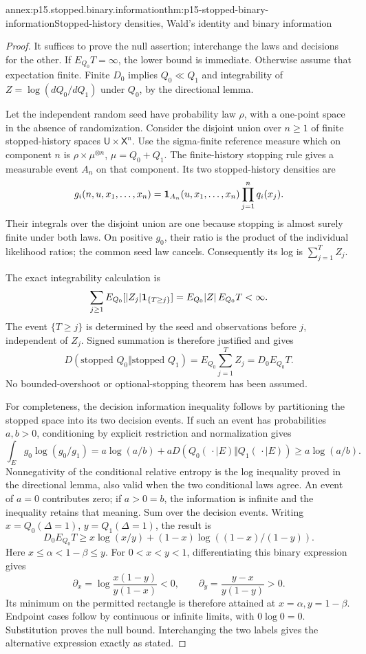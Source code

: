 \begin{annexitem}{annex:p15.stopped.binary.information}{thm:p15-stopped-binary-information}{Stopped-history densities, Wald's identity and binary information}
\begin{proof}
It suffices to prove the null assertion; interchange the laws and
decisions for the other. If \(E_{Q_0}T=\infty\), the lower bound is
immediate. Otherwise assume that expectation finite.
Finite \(D_0\) implies \(Q_0\ll Q_1\) and integrability of
\(Z=\log(dQ_0/dQ_1)\) under \(Q_0\), by the directional lemma.

Let the independent random seed have probability law \(\rho\), with
a one-point space in the absence of randomization.
Consider the disjoint union over \(n\geq1\) of finite stopped-history
spaces \(\mathsf U\times\mathsf X^n\).
Use the sigma-finite reference measure which on component \(n\)
is \(\rho\times\mu^{\otimes n}\), \(\mu=Q_0+Q_1\).
The finite-history stopping rule gives a measurable event \(A_n\)
on that component. Its two stopped-history densities are
\[
 g_i(n,u,x_1,\ldots,x_n)
       ={\bf1}_{A_n}(u,x_1,\ldots,x_n)\prod_{j=1}^nq_i(x_j).
\]
Their integrals over the disjoint union are one because stopping
is almost surely finite under both laws.
On positive \(g_0\), their ratio is the product of the individual
likelihood ratios; the common seed law cancels.
Consequently its log is \(\sum_{j=1}^T Z_j\).

The exact integrability calculation is
\[
 \sum_{j\geq1}E_{Q_0}[|Z_j|{\bf1}_{\{T\geq j\}}]
 =E_{Q_0}|Z|\,E_{Q_0}T<\infty.
\]
The event \(\{T\geq j\}\) is determined by the seed and observations
before \(j\), independent of \(Z_j\). Signed summation is therefore
justified and gives
\[
 D(\text{stopped }Q_0\Vert\text{stopped }Q_1)
 =E_{Q_0}\sum_{j=1}^TZ_j=D_0E_{Q_0}T.
\]
No bounded-overshoot or optional-stopping theorem has been assumed.

For completeness, the decision information inequality follows by
partitioning the stopped space into its two decision events.
If such an event has probabilities \(a,b>0\), conditioning by explicit
restriction and normalization gives
\[
 \int_E g_0\log(g_0/g_1)
 =a\log(a/b)+aD(Q_0(\,\cdot\mid E)\Vert Q_1(\,\cdot\mid E))
 \geq a\log(a/b).
\]
Nonnegativity of the conditional relative entropy is the log inequality
proved in the directional lemma, also valid when the two conditional
laws agree. An event of \(a=0\) contributes zero; if \(a>0=b\),
the information is infinite and the inequality retains that meaning.
Sum over the decision events. Writing
\(x=Q_0(\Delta=1)\), \(y=Q_1(\Delta=1)\), the result is
\[
 D_0E_{Q_0}T\geq
 x\log(x/y)+(1-x)\log((1-x)/(1-y)).
\]
Here \(x\leq\alpha<1-\beta\leq y\).
For \(0<x<y<1\), differentiating this binary expression gives
\[
 \partial_x=\log\frac{x(1-y)}{y(1-x)}<0,\qquad
 \partial_y=\frac{y-x}{y(1-y)}>0.
\]
Its minimum on the permitted rectangle is therefore attained at
\(x=\alpha,y=1-\beta\). Endpoint cases follow by continuous or
infinite limits, with \(0\log0=0\).
Substitution proves the null bound. Interchanging the two labels
gives the alternative expression exactly as stated.
\end{proof}
\end{annexitem}

